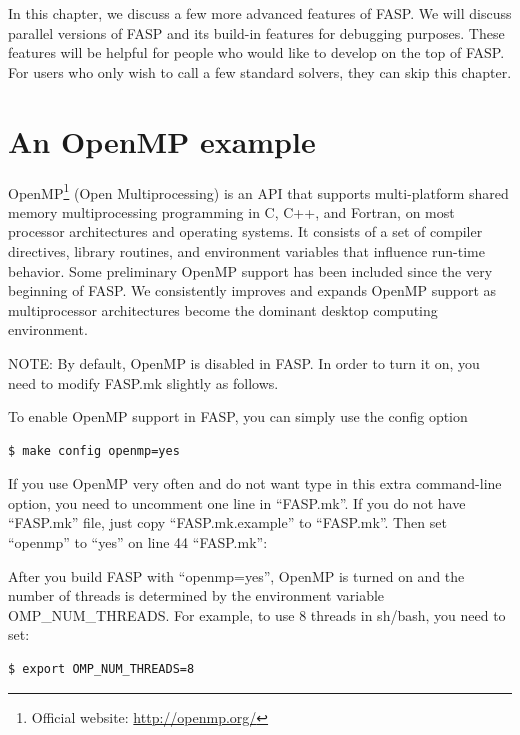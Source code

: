 \documentclass[11pt]{memoir}
\begin{document}
In this chapter, we discuss a few more advanced features of FASP. We
will discuss parallel versions of FASP and its build-in features for
debugging purposes. These features will be helpful for people who
would like to develop on the top of FASP. For users who only wish to
call a few standard solvers, they can skip this chapter.

\section{An OpenMP example}\label{sec:mop}

OpenMP\footnote{Official website: \url{http://openmp.org/}} (Open Multiprocessing) is an API that supports multi-platform shared memory multiprocessing programming in C, C++, and Fortran, on most processor architectures and operating systems. It consists of a set of compiler directives, library routines, and environment variables that influence run-time behavior. Some preliminary OpenMP support has been included since the very beginning of FASP. We consistently improves and expands OpenMP support as multiprocessor architectures become the dominant desktop computing environment.

\begin{snugshade}\noindent
NOTE: By default, OpenMP is disabled in FASP. In order to turn it on, you need to modify FASP.mk slightly as follows.
\end{snugshade}

To enable OpenMP support in FASP, you can simply use the config option
%
\begin{lstlisting}[numbers=none]
$ make config openmp=yes
\end{lstlisting}
%
If you use OpenMP very often and do not want type in this extra
command-line option, you need to uncomment one line in ``FASP.mk''.
If you do not have ``FASP.mk'' file, just copy ``FASP.mk.example'' to
``FASP.mk''. Then set ``openmp'' to ``yes'' on line 44 ``FASP.mk'':


After you build FASP with ``openmp=yes'', OpenMP is turned on and the number of threads is determined by the environment variable OMP\_NUM\_THREADS. For example, to use 8 threads in {\color{red} sh/bash}, you need to set:
\begin{lstlisting}[numbers=none]
$ export OMP_NUM_THREADS=8
\end{lstlisting}
\end{document}
